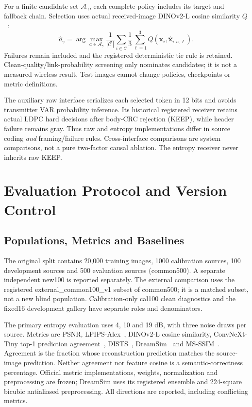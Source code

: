 For a finite candidate set $\mathcal A_\gamma$, each complete policy includes its target and fallback chain. Selection uses actual received-image DINOv2-L cosine similarity $Q$~\cite{oquab2024dinov2}:
\begin{equation}
 \widehat a_\gamma=\arg\max_{a\in\mathcal A_\gamma}
 \frac{1}{|\mathcal C|}\sum_{i\in\mathcal C}\frac{1}{3}\sum_{\ell=1}^{3}Q(\mathbf x_i,\widehat{\mathbf x}_{i,a,\ell}).
\label{eq:select}
\end{equation}
Failures remain included and the registered deterministic tie rule is retained. Clean-quality/link-probability screening only nominates candidates; it is not a measured wireless result. Test images cannot change policies, checkpoints or metric definitions.

The auxiliary raw interface serializes each selected token in 12 bits and avoids transmitter VAR probability inference. Its historical registered receiver retains actual LDPC hard decisions after body-CRC rejection (KEEP), while header failure remains gray. Thus raw and entropy implementations differ in source coding \emph{and} framing/failure rules. Cross-interface comparisons are system comparisons, not a pure two-factor causal ablation. The entropy receiver never inherits raw KEEP.

\section{Evaluation Protocol and Version Control}
\subsection{Populations, Metrics and Baselines}
The original split contains 20,000 training images, 1000 calibration sources, 100 development sources and 500 evaluation sources (common500). A separate independent new100 is reported separately. The external comparison uses the registered external\_common100\_v1 subset of common500; it is a matched subset, not a new blind population. Calibration-only cal100 clean diagnostics and the fixed16 development gallery have separate roles and denominators.

The primary entropy evaluation uses 4, 10 and 19 dB, with three noise draws per source. Metrics are PSNR, LPIPS-Alex~\cite{zhang2018lpips}, DINOv2-L cosine similarity, ConvNeXt-Tiny top-1 prediction agreement~\cite{liu2022convnext}, DISTS~\cite{ding2021dists}, DreamSim~\cite{fu2023dreamsim} and MS-SSIM~\cite{wang2003msssim}. Agreement is the fraction whose reconstruction prediction matches the source-image prediction. Neither agreement nor feature cosine is a semantic-correctness percentage. Official metric implementations, weights, normalization and preprocessing are frozen; DreamSim uses its registered ensemble and 224-square bicubic antialiased preprocessing. All directions are reported, including conflicting metrics.

